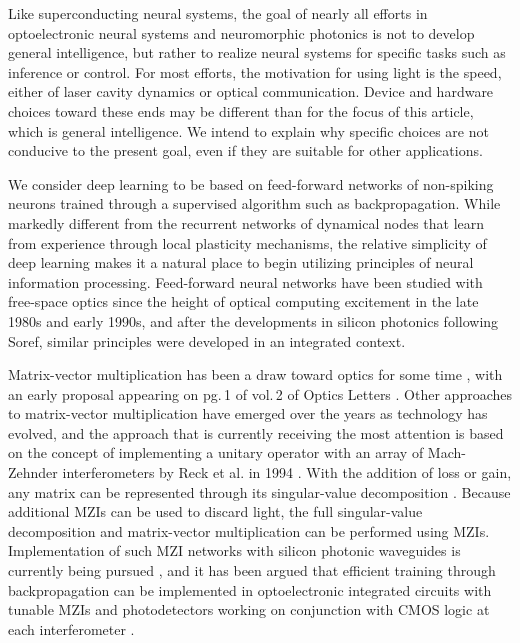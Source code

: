 Like superconducting neural systems, the goal of nearly all efforts in optoelectronic neural systems and neuromorphic photonics is not to develop general intelligence, but rather to realize neural systems for specific tasks such as inference or control. For most efforts, the motivation for using light is the speed, either of laser cavity dynamics or optical communication. Device and hardware choices toward these ends may be different than for the focus of this article, which is general intelligence. We intend to explain why specific choices are not conducive to the present goal, even if they are suitable for other applications.

We consider deep learning to be based on feed-forward networks of non-spiking neurons trained through a supervised algorithm such as backpropagation. While markedly different from the recurrent networks of dynamical nodes that learn from experience through local plasticity mechanisms, the relative simplicity of deep learning makes it a natural place to begin utilizing principles of neural information processing. Feed-forward neural networks have been studied with free-space optics since the height of optical computing excitement in the late 1980s and early 1990s, and after the developments in silicon photonics following Soref, similar principles were developed in an integrated context. 

Matrix-vector multiplication has been a draw toward optics for some time \cite{godi1978,ve1984,maar1987}, with an early proposal appearing on pg.\,1 of vol.\,2 of Optics Letters \cite{godi1978}. Other approaches to matrix-vector multiplication have emerged over the years as technology has evolved, and the approach that is currently receiving the most attention is based on the concept of implementing a unitary operator with an array of Mach-Zehnder interferometers by Reck et al. in 1994 \cite{reze1994}. With the addition of loss or gain, any matrix can be represented through its singular-value decomposition \cite{st2016}. Because additional MZIs can be used to discard light, the full singular-value decomposition and matrix-vector multiplication can be performed using MZIs. Implementation of such MZI networks with silicon photonic waveguides is currently being pursued \cite{mi2015_fix_ref,shha2017}, and it has been argued that efficient training through backpropagation can be implemented in optoelectronic integrated circuits with tunable MZIs and photodetectors working on conjunction with CMOS logic at each interferometer \cite{humi2018}.

